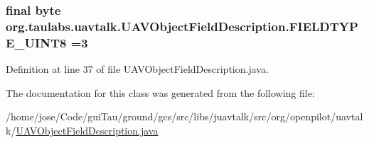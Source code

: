 \hypertarget{classorg_1_1taulabs_1_1uavtalk_1_1_u_a_v_object_field_description_a35a1cfdb03119d8107d7d16e92821b1b}{
\subsubsection[{F\-I\-E\-L\-D\-T\-Y\-P\-E\-\_\-\-U\-I\-N\-T8}]{\setlength{\rightskip}{0pt plus 5cm}final byte org.\-taulabs.\-uavtalk.\-U\-A\-V\-Object\-Field\-Description.\-F\-I\-E\-L\-D\-T\-Y\-P\-E\-\_\-\-U\-I\-N\-T8 =3\hspace{0.3cm}{\ttfamily [static]}}}\label{classorg_1_1taulabs_1_1uavtalk_1_1_u_a_v_object_field_description_a35a1cfdb03119d8107d7d16e92821b1b}


Definition at line 37 of file U\-A\-V\-Object\-Field\-Description.\-java.



The documentation for this class was generated from the following file\-:\begin{DoxyCompactItemize}
\item 
/home/jose/\-Code/gui\-Tau/ground/gcs/src/libs/juavtalk/src/org/openpilot/uavtalk/\hyperlink{_u_a_v_object_field_description_8java}{U\-A\-V\-Object\-Field\-Description.\-java}\end{DoxyCompactItemize}
